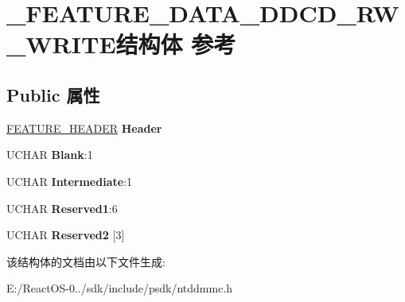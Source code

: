 \hypertarget{struct___f_e_a_t_u_r_e___d_a_t_a___d_d_c_d___r_w___w_r_i_t_e}{}\section{\+\_\+\+F\+E\+A\+T\+U\+R\+E\+\_\+\+D\+A\+T\+A\+\_\+\+D\+D\+C\+D\+\_\+\+R\+W\+\_\+\+W\+R\+I\+T\+E结构体 参考}
\label{struct___f_e_a_t_u_r_e___d_a_t_a___d_d_c_d___r_w___w_r_i_t_e}
\subsection*{Public 属性}
\begin{DoxyCompactItemize}
\item 
\mbox{\label{struct___f_e_a_t_u_r_e___d_a_t_a___d_d_c_d___r_w___w_r_i_t_e_a6b9190afd5fa209129ea67db68546977}} 
\hyperlink{struct___f_e_a_t_u_r_e___h_e_a_d_e_r}{F\+E\+A\+T\+U\+R\+E\+\_\+\+H\+E\+A\+D\+ER} {\bfseries Header}
\item 
\mbox{\label{struct___f_e_a_t_u_r_e___d_a_t_a___d_d_c_d___r_w___w_r_i_t_e_aceb948ac9f42ed464ca3709c44301876}} 
U\+C\+H\+AR {\bfseries Blank}\+:1
\item 
\mbox{\label{struct___f_e_a_t_u_r_e___d_a_t_a___d_d_c_d___r_w___w_r_i_t_e_ad16f2390da387c93c252ef21ba000fa3}} 
U\+C\+H\+AR {\bfseries Intermediate}\+:1
\item 
\mbox{\label{struct___f_e_a_t_u_r_e___d_a_t_a___d_d_c_d___r_w___w_r_i_t_e_a3c60571d41bb3fe5ca029e8d062ceebe}} 
U\+C\+H\+AR {\bfseries Reserved1}\+:6
\item 
\mbox{\label{struct___f_e_a_t_u_r_e___d_a_t_a___d_d_c_d___r_w___w_r_i_t_e_a980960060f4a0b3374b563adb9345520}} 
U\+C\+H\+AR {\bfseries Reserved2} \mbox{[}3\mbox{]}
\end{DoxyCompactItemize}


该结构体的文档由以下文件生成\+:\begin{DoxyCompactItemize}
\item 
E\+:/\+React\+O\+S-\/0../sdk/include/psdk/ntddmmc.\+h\end{DoxyCompactItemize}
